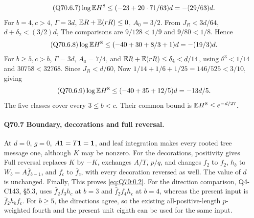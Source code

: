 \begin{equation}\tag{Q70.6.7}\label{eq:Q70:6.7}
\log\mathbb E H^8\le(-23+20\cdot71/63)d=-(29/63)d.
\end{equation}
For \(b=\allowbreak 4,\allowbreak c>\allowbreak 4\), \(\Gamma=\allowbreak 3d\), \(\mathbb E R+\mathbb E(rR)\le\allowbreak 0\),
\(A_0=\allowbreak 3/2\). From \(J_R<\allowbreak 3d/64\), \(d+\delta_2<\allowbreak (3/2)d\),
The comparisons are \(9/128<\allowbreak 1/9\) and \(9/80<\allowbreak 1/8\). Hence
\begin{equation}\tag{Q70.6.8}\label{eq:Q70:6.8}
\log\mathbb E H^8\le(-40+30+8/3+1)d=-(19/3)d.
\end{equation}
For \(b\ge\allowbreak 5,\allowbreak c>\allowbreak b\), \(\Gamma=\allowbreak 3d\), \(A_0=\allowbreak 7/4\), and
\(\mathbb E R+\mathbb E(rR)\le\allowbreak \delta_4<\allowbreak d/14\), using \(\theta^3<\allowbreak 1/14\)
and \(30758<\allowbreak 32768\). Since \(J_R<\allowbreak d/60\),
Now \(1/14+1/6+1/25=\allowbreak 146/525<\allowbreak 3/10\), giving
\begin{equation}\tag{Q70.6.9}\label{eq:Q70:6.9}
\log\mathbb E H^8\le(-40+35+12/5)d=-13d/5.
\end{equation}
The five classes cover every \(3\le\allowbreak  b<\allowbreak c\). Their common bound is
\(\mathbb E H^8\le\allowbreak  e^{-d/27}\).

\paragraph{Q70.7 Boundary, decorations and full reversal.}
At \(d=\allowbreak 0\), \(g=\allowbreak 0\), \(A\mathbf1=\allowbreak T\mathbf1=\allowbreak \mathbf1\), and leaf integration
makes every rooted tree message one, although \(K\) may be nonzero.
For the decorations, positivity gives
Full reversal replaces \(K\) by \(-K\), exchanges \(A/T\), \(p/q\),
and changes \(\bar f_2\) to \(f_2\), \(h_b\) to
\(W_b=\allowbreak A\bar f_{b-1}\), and \(f_c\) to \(\bar f_c\), with every
decoration reversed as well. The value of \(d\) is unchanged.
Finally,
This proves \eqref{eq:Q70:0.2}.
For the direction comparison, Q4-C143, \S5.3, uses
\(\bar f_2f_3h_c\) at \(b=\allowbreak 3\) and \(\bar f_2f_4h_c\) at \(b=\allowbreak 4\),
whereas the present input is \(\bar f_2h_bf_c\).
For \(b\ge\allowbreak 5\), the directions agree, so the existing all-positive-length
\(p\)-weighted fourth and the present unit eighth can be used for the
same input.
